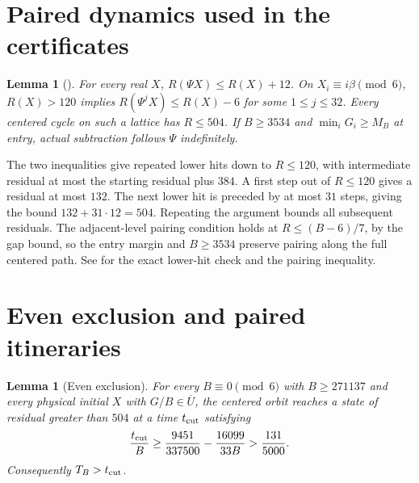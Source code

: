 \documentclass[11pt,reqno]{amsart}
\newtheorem{lemma}[theorem]{Lemma}
\theoremstyle{remark}
\begin{document}
\appendix
\section{Paired dynamics used in the certificates}

\begin{lemma}[{\cite[\S6 and Appendix~E]{G6}}]\label{lem:inherited}
For every real \(X\), \(R(\Psi X)\le R(X)+12\). On \(X_i\equiv i\beta\pmod6\), \(R(X)>120\) implies \(R(\Psi^jX)\le R(X)-6\) for some \(1\le j\le32\). Every centered cycle on such a lattice has \(R\le504\). If \(B\ge3534\) and \(\min_i G_i\ge M_B\) at entry, actual subtraction follows \(\Psi\) indefinitely.
\end{lemma}

The two inequalities give repeated lower hits down to \(R\le120\), with intermediate residual at most the starting residual plus \(384\). A first step out of \(R\le120\) gives a residual at most \(132\). The next lower hit is preceded by at most \(31\) steps, giving the bound \(132+31\cdot12=504\). Repeating the argument bounds all subsequent residuals. The adjacent-level pairing condition holds at \(R\le(B-6)/7\), by the gap bound, so the entry margin and \(B\ge3534\) preserve pairing along the full centered path. See \cite{G6} for the exact lower-hit check and the pairing inequality.

\section{Even exclusion and paired itineraries}

\begin{lemma}[Even exclusion]\label{lem:exclusion}
For every \(B\equiv0\pmod6\) with \(B\ge271137\) and every physical initial \(X\) with \(G/B\in\overline U\), the centered orbit reaches a state of residual greater than \(504\) at a time \(t_{\rm cut}\) satisfying
\[
 \frac{t_{\rm cut}}{B}\ge\frac{9451}{337500}-\frac{16099}{33B}>\frac{131}{5000}.
\]
Consequently \(T_B>t_{\rm cut}\).
\end{lemma}
\end{document}
